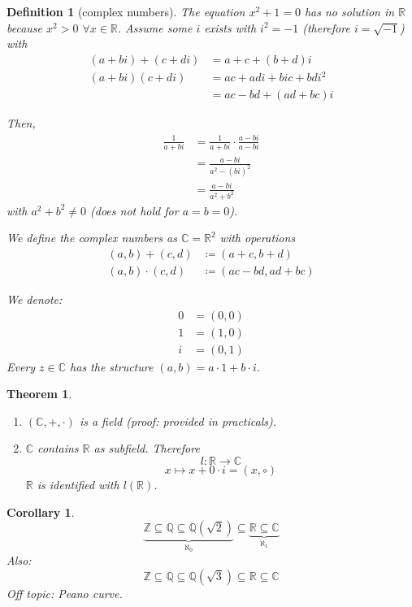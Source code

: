 \documentclass[a4paper,landscape,twocolumn]{article}
\newtheorem{theorem}{Theorem}[section]
\newtheorem{defi}{Definition}[section]
\newtheorem{cor}{Corollary}[section]
\begin{document}
\begin{defi}[complex numbers]
  The equation $x^2 + 1 = 0$ has no solution in $\mathbb R$ because $x^2 > 0$
  $\forall x \in \mathbb R$. Assume some $i$ exists with $i^2 = -1$
  (therefore $i = \sqrt{-1}$) with
  \begin{align*}
    (a + bi) + (c + di) &= a + c + (b + d)i \\
    (a + bi) (c + di) &= ac + adi + bic + bdi^2 \\
      &= ac - bd + (ad + bc) i
  \end{align*}

  Then,
  \begin{align*}
    \frac{1}{a + bi} &= \frac{1}{a + bi} \cdot \frac{a - bi}{a - bi} \\
        &= \frac{a - bi}{a^2 - (bi)^2} \\
        &= \frac{a - bi}{a^2 + b^2}
  \end{align*}
  with $a^2 + b^2 \neq 0$ (does not hold for $a = b = 0$).

  We define the complex numbers as $\mathbb C = \mathbb R^2$
  with operations
  \begin{align*}
    (a, b) + (c, d) &\coloneqq (a + c, b + d) \\
    (a, b) \cdot (c, d) &\coloneqq (ac - bd, ad + bc)
  \end{align*}

  We denote:
  \begin{align*}
    0 &= (0, 0) \\
    1 &= (1, 0) \\
    i &= (0, 1)
  \end{align*}
  Every $z \in \mathbb C$ has the structure $(a, b) = a \cdot 1 + b \cdot i$.
\end{defi}

\begin{theorem}
  \begin{enumerate}
    \item $(\mathbb C, +, \cdot)$ is a field (proof: provided in practicals).
    \item $\mathbb C$ contains $\mathbb R$ as subfield. Therefore
      \[ l: \mathbb R \rightarrow \mathbb C \]
      \[ x \mapsto x + 0 \cdot i = (x, \circ) \]
      $\mathbb R$ is identified with $l(\mathbb R)$.
  \end{enumerate}
\end{theorem}

\begin{cor}
  \[
    \underbrace{\mathbb Z \subseteq \mathbb Q \subseteq \mathbb Q(\sqrt{2})}_{\aleph_0}
    \subseteq \underbrace{\mathbb R \subseteq \mathbb C}_{\aleph_1}
  \]
  Also:
  \[
    \mathbb Z \subseteq \mathbb Q \subseteq \mathbb Q(\sqrt{3})
    \subseteq \mathbb R \subseteq \mathbb C
  \]
  Off topic: Peano curve.
\end{cor}
\end{document}
